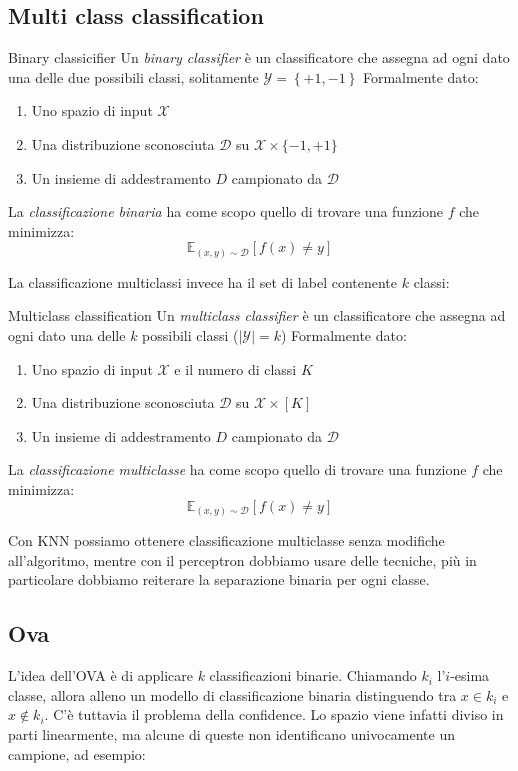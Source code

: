 \subsection{Multi class classification}
\begin{definizione}{Binary classicifier}
	Un \textit{binary classifier} è un classificatore che assegna ad ogni dato una delle due possibili classi, solitamente $ \mathcal{Y} = \left\{+1, -1\right\} $
	\vskip3mm
	Formalmente dato:
	\begin{enumerate}
		\item Uno spazio di input $\mathcal{X}$
		\item Una distribuzione sconosciuta $\mathcal{D}$ su $\mathcal{X} \times \{-1, +1\}$
		\item Un insieme di addestramento $D$ campionato da $\mathcal{D}$
	\end{enumerate}

	La \textit{classificazione binaria} ha come scopo quello di trovare una funzione $f$ che minimizza:
	\[
		\mathbb{E}_{(x, y) \sim \mathcal{D}} \left[ f(x) \neq y \right]
	\]
\end{definizione}
La classificazione multiclassi invece ha il set di label contenente $ k $ classi:
\begin{definizione}{Multiclass classification}
	Un \textit{multiclass classifier} è un classificatore che assegna ad ogni dato una delle $ k $ possibili classi ($ \left|\mathcal{Y}\right| = k $)
	\vskip3mm
	Formalmente dato:
	\begin{enumerate}
		\item Uno spazio di input $\mathcal{X}$ e il numero di classi $K$
		\item Una distribuzione sconosciuta $\mathcal{D}$ su $\mathcal{X} \times [K]$
		\item Un insieme di addestramento $D$ campionato da $\mathcal{D}$
	\end{enumerate}

	La \textit{classificazione multiclasse} ha come scopo quello di trovare una funzione $f$ che minimizza:
	\[
		\mathbb{E}_{(x, y) \sim \mathcal{D}} \left[ f(x) \neq y \right]
	\]
\end{definizione}
Con KNN possiamo ottenere classificazione multiclasse senza modifiche all'algoritmo, mentre con il perceptron dobbiamo usare delle tecniche, più in particolare dobbiamo reiterare la separazione binaria per ogni classe.
\subsection{Ova}
L'idea dell'OVA è di applicare $ k $ classificazioni binarie. Chiamando $ k_i $ l'$ i $-esima classe, allora alleno un modello di classificazione binaria distinguendo tra $ x \in k_i $ e $ x \not \in k_i $. C'è tuttavia il problema della confidence. Lo spazio viene infatti diviso in parti linearmente, ma alcune di queste non identificano univocamente un campione, ad esempio:

